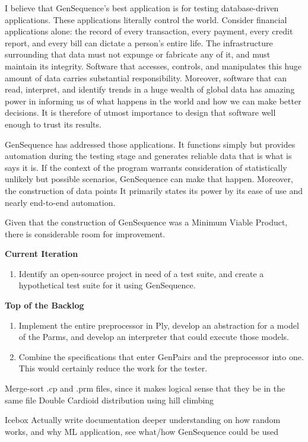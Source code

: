 
I believe that GenSequence's best application is for testing database-driven applications. These applications literally control the world. Consider financial applications alone: the record of every transaction, every payment, every credit report, and every bill can dictate a person’s entire life. The infrastructure surrounding that data must not expunge or fabricate any of it, and must maintain its integrity. Software that accesses, controls, and manipulates this huge amount of data carries substantial responsibility. Moreover, software that can read, interpret, and identify trends in a huge wealth of global data has amazing power in informing us of what happens in the world and how we can make better decisions. It is therefore of utmost importance to design that software well enough to trust its results.

GenSequence has addressed those applications. It functions simply but provides automation during the testing stage and generates reliable data that is what is says it is. If the context of the program warrants consideration of statistically unlikely but possible scenarios, GenSequence can make that happen. Moreover, the construction of data points It primarily states its power by its ease of use and nearly end-to-end automation.

Given that the construction of GenSequence was a Minimum Viable Product, there is considerable room for improvement.

\textbf{Current Iteration}
\begin{enumerate}
\item Identify an open-source project in need of a test suite, and create a hypothetical test suite for it using GenSequence.
\end{enumerate}

\textbf{Top of the Backlog}
\begin{enumerate}
\item Implement the entire preprocessor in Ply, develop an abstraction for a model of the Parms, and develop an interpreter that could execute those models.
\item Combine the specifications that enter GenPairs and the preprocessor into one. This would certainly reduce the work for the tester.
\end{enumerate}
Merge-sort .cp and .prm files, since it makes logical sense that they be in the same file
Double Cardioid distribution using hill climbing


Icebox
Actually write documentation
deeper understanding on how random works, and why
ML application, see what/how GenSequence could be used
